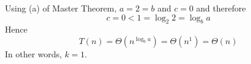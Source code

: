  Using (a) of Master Theorem, $a = 2 = b$ and $c = 0$
 and therefore
   \[
  c = 0 < 1 = \log_2 2 = \log_b a
  \]
  Hence
  \[
  T(n) = \Theta(n^{\log_b a}) = \Theta(n^1) = \Theta(n)
  \]
  In other words, $k = 1$.
    
